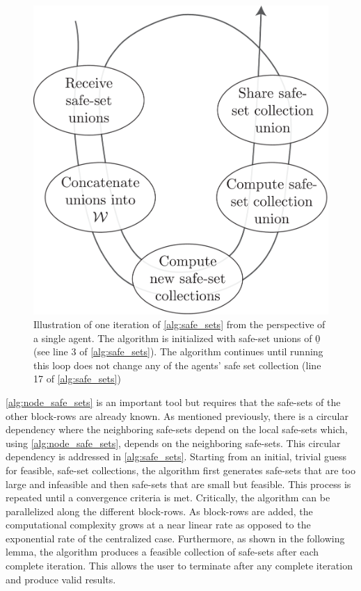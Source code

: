\begin{figure}[t]
	\centering
	\includegraphics[width=0.75\columnwidth]{./figures/alg2_diag}
	\caption{Illustration of one iteration of \autoref{alg:safe_sets} from the perspective of a single agent. The algorithm is initialized with safe-set unions of $\underline{0}$ (see line 3 of \autoref{alg:safe_sets}). The algorithm continues until running this loop does not change any of the agents' safe set collection (line 17 of \autoref{alg:safe_sets})}
\end{figure}
\autoref{alg:node_safe_sets} is an important tool but requires that the safe-sets of the other block-rows are already known. As mentioned previously, there is a circular dependency where the neighboring safe-sets depend on the local safe-sets which, using \autoref{alg:node_safe_sets}, depends on the neighboring safe-sets. This circular dependency is addressed in \autoref{alg:safe_sets}. Starting from an initial, trivial guess for feasible, safe-set collections, the algorithm first generates safe-sets that are too large and infeasible and then safe-sets that are small but feasible. This process is repeated until a convergence criteria is met. Critically, the algorithm can be parallelized along the different block-rows. As block-rows are added, the computational complexity grows at a near linear rate as opposed to the exponential rate of the centralized case. Furthermore, as shown in the following lemma, the algorithm produces a feasible collection of safe-sets after each complete iteration. This allows the user to terminate after any complete iteration and produce valid results. 
